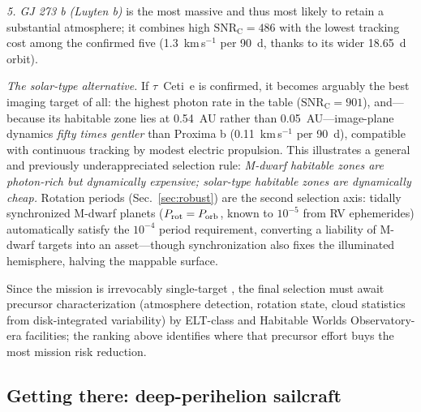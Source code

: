 ﻿\documentclass[twocolumn,10pt]{article}
\begin{document}
{\it 5. GJ 273 b (Luyten b)} is the most massive and thus most likely
to retain a substantial atmosphere; it combines high
$\mathrm{SNR_C}=486$ with the lowest tracking cost among the confirmed
five (1.3~km\,s$^{-1}$ per 90~d, thanks to its wider 18.65~d orbit).

{\it The solar-type alternative.} If $\tau$~Ceti~e is confirmed, it
becomes arguably the best imaging target of all: the highest photon
rate in the table ($\mathrm{SNR_C}=901$), and---because its habitable
zone lies at 0.54~AU rather than 0.05~AU---image-plane dynamics
{\it fifty times gentler} than Proxima b (0.11~km\,s$^{-1}$ per 90~d),
compatible with continuous tracking by modest electric propulsion. This
illustrates a general and previously underappreciated selection rule:
{\it M-dwarf habitable zones are photon-rich but dynamically expensive;
solar-type habitable zones are dynamically cheap.} Rotation periods
(Sec.~\ref{sec:robust}) are the second selection axis: tidally
synchronized M-dwarf planets ($P_{\rm rot}=P_{\rm orb}$, known to
$10^{-5}$ from RV ephemerides) automatically satisfy the $10^{-4}$
period requirement, converting a liability of M-dwarf targets into an
asset---though synchronization also fixes the illuminated hemisphere,
halving the mappable surface.

Since the mission is irrevocably single-target \citep{tur26uhr}, the
final selection must await precursor characterization (atmosphere
detection, rotation state, cloud statistics from disk-integrated
variability) by ELT-class and Habitable Worlds Observatory-era
facilities; the ranking above identifies where that precursor effort
buys the most mission risk reduction.

\subsection{Getting there: deep-perihelion sailcraft}
\label{sec:sail}
\end{document}
